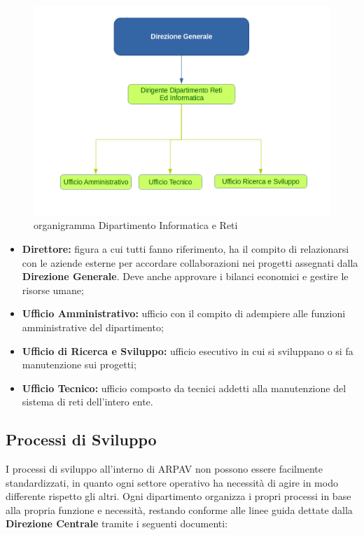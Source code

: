 \begin{figure}[htbp]
	\centering
	\includegraphics[scale=0.4]{./capitoli/capitolo1/img/organigrammaDip}
	\caption{organigramma Dipartimento Informatica e Reti}
\end{figure}

\begin{itemize}

	\item \textbf{Direttore:} figura a cui tutti fanno riferimento, ha il compito di relazionarsi con le aziende esterne per accordare collaborazioni nei progetti assegnati dalla \textbf{Direzione Generale}. Deve anche approvare i bilanci economici e gestire le risorse umane;
	\item \textbf{Ufficio Amministrativo:} ufficio con il compito di adempiere alle funzioni amministrative del dipartimento;
	\item \textbf{Ufficio di Ricerca e Sviluppo:} ufficio esecutivo in cui si sviluppano o si fa manutenzione sui progetti;
	\item \textbf{Ufficio Tecnico:} ufficio composto da tecnici addetti alla manutenzione del sistema di reti dell'intero ente.
	
\end{itemize}
\subsection{Processi di Sviluppo}


I processi di sviluppo all'interno di  ARPAV non possono essere facilmente standardizzati, in quanto ogni settore operativo ha necessità di agire in modo differente rispetto gli altri. Ogni dipartimento organizza i propri processi in base alla propria funzione e necessità, restando conforme alle linee guida dettate dalla \textbf{Direzione Centrale} tramite i seguenti documenti: 

